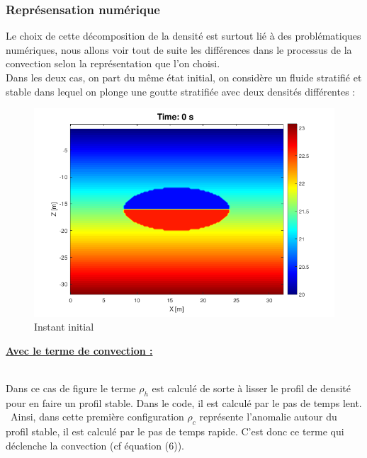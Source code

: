 \documentclass{rapportECC}
\begin{document}
\subsubsection{Représensation numérique}

Le choix de cette décomposition de la densité est surtout lié à  des problématiques numériques, nous allons voir tout de suite les différences dans le processus de la convection selon la représentation que l'on choisi. \\
Dans les deux cas, on part du même état initial, on considère un fluide stratifié et stable dans lequel on plonge une goutte stratifiée avec deux densités différentes :

\begin{figure}[H]
    \centering
    \includegraphics[width=0.7
    \textwidth]{images/Int_ConvT0.png}
    \caption{Instant initial}
\end{figure}


\vspace{1 cm}
\underline{\textbf{Avec le terme de convection :}}
\vspace{0.5 cm}

\\
Dans ce cas de figure le terme $\rho_h$ est calculé de sorte à  lisser le profil de densité pour en faire un profil stable. Dans le code, il est calculé par le pas de temps lent. \
Ainsi, dans cette première configuration $\rho_c$ représente l'anomalie autour du profil stable, il est calculé par le pas de temps rapide. C'est donc ce terme qui déclenche la convection (cf équation (6)). \\
\end{document}
